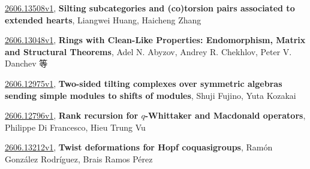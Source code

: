 \documentclass[9pt, a4paper]{article}
\theoremstyle{plain}
\theoremstyle{definition}
\theoremstyle{remark}
\newcommand{\arxiv}[3]{\href{https://arxiv.org/abs/#1}{#1}, \textbf{\textcolor{arxivblue}{#2}}, #3}
\begin{document}
\arxiv{2606.13508v1}{Silting subcategories and (co)torsion pairs associated to extended hearts}{Liangwei Huang, Haicheng Zhang}

\arxiv{2606.13048v1}{Rings with Clean-Like Properties: Endomorphism, Matrix and Structural Theorems}{Adel N. Abyzov, Andrey R. Chekhlov, Peter V. Danchev 等}

\arxiv{2606.12975v1}{Two-sided tilting complexes over symmetric algebras sending simple modules to shifts of modules}{Shuji Fujino, Yuta Kozakai}

\arxiv{2606.12796v1}{Rank recursion for $q$-Whittaker and Macdonald operators}{Philippe Di Francesco, Hieu Trung Vu}

\arxiv{2606.13212v1}{Twist deformations for Hopf coquasigroups}{Ramón González Rodríguez, Brais Ramos Pérez}

\end{document}
